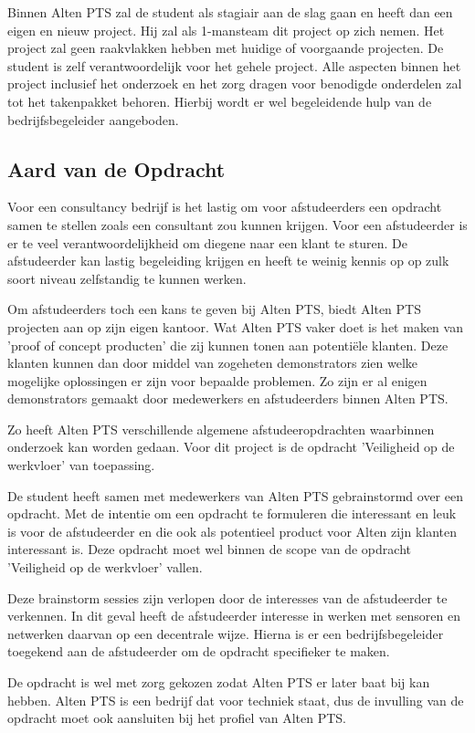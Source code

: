 \documentclass{../local}
\begin{document}
Binnen Alten PTS zal de student als stagiair aan de slag gaan en heeft dan een eigen en nieuw project. Hij zal als 1-mansteam dit project op zich nemen. Het project zal geen raakvlakken hebben met huidige of voorgaande projecten. De student is zelf verantwoordelijk voor het gehele project. Alle aspecten binnen het project inclusief het onderzoek en het zorg dragen voor benodigde onderdelen zal tot het takenpakket behoren. Hierbij wordt er wel begeleidende hulp van de bedrijfsbegeleider aangeboden.

\subsection{Aard van de Opdracht}

Voor een consultancy bedrijf is het lastig om voor afstudeerders een opdracht samen te stellen zoals een consultant zou kunnen krijgen. Voor een afstudeerder is er te veel verantwoordelijkheid om diegene naar een klant te sturen. De afstudeerder kan lastig begeleiding krijgen en heeft te weinig kennis op op zulk soort niveau zelfstandig te kunnen werken.

Om afstudeerders toch een kans te geven bij Alten PTS, biedt Alten PTS projecten aan op zijn eigen kantoor. Wat Alten PTS vaker doet is het maken van 'proof of concept producten' die zij kunnen tonen aan potentiële klanten. Deze klanten kunnen dan door middel van zogeheten demonstrators zien welke mogelijke oplossingen er zijn voor bepaalde problemen. Zo zijn er al enigen demonstrators gemaakt door medewerkers en afstudeerders binnen Alten PTS.

Zo heeft Alten PTS verschillende algemene afstudeeropdrachten waarbinnen onderzoek kan worden gedaan. Voor dit project is de opdracht 'Veiligheid op de werkvloer' van toepassing.

De student heeft samen met medewerkers van Alten PTS gebrainstormd over een opdracht. Met de intentie om een opdracht te formuleren die interessant en leuk is voor de afstudeerder en die ook als potentieel product voor Alten zijn klanten interessant is. Deze opdracht moet wel binnen de scope van de opdracht 'Veiligheid op de werkvloer' vallen.

Deze brainstorm sessies zijn verlopen door de interesses van de afstudeerder te verkennen. In dit geval heeft de afstudeerder interesse in werken met sensoren en netwerken daarvan op een decentrale wijze. Hierna is er een bedrijfsbegeleider toegekend aan de afstudeerder om de opdracht specifieker te maken.

De opdracht is wel met zorg gekozen zodat Alten PTS er later baat bij kan hebben. Alten PTS is een bedrijf dat voor techniek staat, dus de invulling van de opdracht moet ook aansluiten bij het profiel van Alten PTS.
\end{document}
